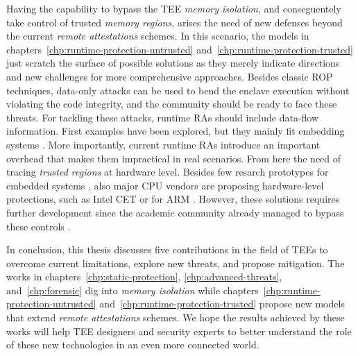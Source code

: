 Having the capability to bypass the TEE \emph{memory isolation}, and 
conseguentely take control of trusted  \emph{memory regions}, arises the need 
of new defenses beyond the current \emph{remote attestations} schemes.
In this scenario, the models in chapters~\ref{chp:runtime-protection-untrusted} 
and~\ref{chp:runtime-protection-trusted} just scratch the surface of 
possible solutions as they merely indicate directions and new challenges for 
more comprehensive approaches.
Besides classic ROP techniques, data-only attacks can be used to bend the 
enclave execution without violating the code integrity, and the community 
should be ready to face these threats.
For tackling these attacks, runtime RAs should include data-flow information.
First examples have been explored, but they mainly fit embedding systems 
\citep{sun2020oat,aberadiat}.
More importantly, current runtime RAs introduce an important overhead 
that makes them impractical in real scenarios.
From here the need of tracing \emph{trusted regions} at hardware level.
Besides few resarch prototypes for embedded systems 
\citep{Dessouky:2018:LLH:3240765.3240821}, also major CPU vendors are proposing 
hardware-level protections, such as Intel CET \citep{intelcet} or for ARM 
\citep{armpa}.
However, these solutions requires further development since the academic 
community already managed to bypass these controls \citep{van2012memory}.

In conclusion, this thesis discusses five contributions in the field of TEEs to 
overcome current limitations, explore new threats, and propose mitigation.
The works in chapters~\ref{chp:static-protection}, \ref{chp:advanced-threats}, 
and~\ref{chp:forensic} dig into \emph{memory isolation} while 
chapters~\ref{chp:runtime-protection-untrusted} 
and~\ref{chp:runtime-protection-trusted} propose new models that extend 
\emph{remote attestations} schemes.
We hope the results achieved by these works will help TEE designers and 
security experts to better understand the role of these new technologies in 
an even more connected world.


